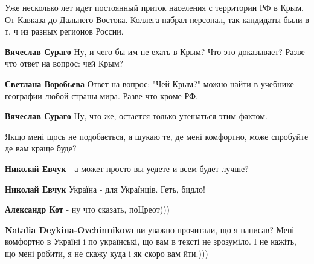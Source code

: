 \begin{itemize}
\begin{itemize}
Уже несколько лет идет постоянный приток населения с территории РФ в Крым. От
Кавказа до Дальнего Востока. Коллега набрал персонал, так кандидаты были в т. ч
из разных регионов России.


\textbf{Вячеслав Сураго} Ну, и чего бы им не ехать в Крым? Что это доказывает? Разве что ответ на вопрос: чей Крым?


\textbf{Светлана Воробьева} Ответ на вопрос: "Чей Крым?" можно найти в учебнике географии любой страны мира. Разве что кроме РФ.


\textbf{Вячеслав Сураго} Ну, что же, остается только утешаться этим фактом.

\end{itemize}



Якщо мені щось не подобається, я шукаю те, де мені комфортно, може спробуйте де
вам краще буде?

\begin{itemize}

\textbf{Николай Евчук} - а может просто вы уедете и всем будет лучше?


\textbf{Николай Евчук} Україна - для Українців. Геть, бидло!


\textbf{Александр Кот} - ну что сказать, поЦреот)))


\textbf{Natalia Deykina-Ovchinnikova} ви уважно прочитали, що я написав? Мені комфортно в Україні і по українські, що вам в тексті не зрозуміло. І не кажіть, що мені робити, я не скажу куда і як скоро вам йти.)))


\end{itemize}
\end{itemize}
